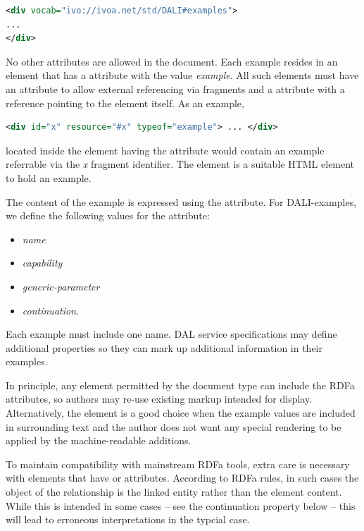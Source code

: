 \documentclass[11pt,letter]{ivoa}
\begin{document}
\begin{lstlisting}[language=XML]
<div vocab="ivo://ivoa.net/std/DALI#examples">
...
</div>
\end{lstlisting}

No other  attributes are allowed in the document. Each example resides in 
an element that has a  attribute with the value
\emph{example}. All such elements 
must have an  attribute to allow external referencing via fragments and a 
 attribute with a reference pointing to the element itself. As an 
example,

\begin{lstlisting}[language=XML]
<div id="x" resource="#x" typeof="example"> ... </div>
\end{lstlisting}

\noindent located inside the element having the  attribute would 
contain an example referrable via the \emph{x} fragment identifier. The
 element is 
a suitable HTML element to hold an example.

The content of the example is expressed using the  attribute. For 
DALI-examples, we define the following values for the  attribute: 

\begin{itemize}
\item \emph{name}
\item \emph{capability}
\item \emph{generic-parameter}
\item \emph{continuation}.
\end{itemize}

Each example must include one 
name.  DAL service specifications may define additional 
properties so they can mark up additional information in their examples.

In principle, any element permitted by the document type can include the RDFa 
attributes, so authors may re-use existing markup intended for display. 
Alternatively, the  element is a good choice when the example values are 
included in surrounding text and the author does not want any special rendering 
to be applied by the machine-readable additions.

To maintain compatibility with mainstream RDFa tools, extra care is
necessary with elements that have  or 
attributes.  According to RDFa rules, in such cases the object of the
relationship is the linked entity rather than the element content.
While this is intended in some cases -- see the continuation property
below -- this will lead to erroneous interpretations in the typcial
case.
\end{document}
